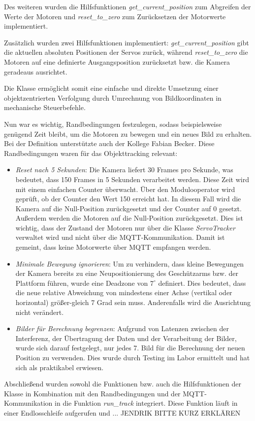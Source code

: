 Des weiteren wurden die Hilfsfunktionen \textit{get\_current\_position} zum Abgreifen der Werte der Motoren und \textit{reset\_to\_zero} zum Zurücksetzen der Motorwerte implementiert.

Zusätzlich wurden zwei Hilfsfunktionen implementiert: \textit{get\_current\_position} gibt die aktuellen absoluten Positionen der Servos zurück, während \textit{reset\_to\_zero} die Motoren auf eine definierte Ausgangsposition zurücksetzt bzw. die Kamera geradeaus ausrichtet.

Die Klasse ermöglicht somit eine einfache und direkte Umsetzung einer objektzentrierten Verfolgung durch Umrechnung von Bildkoordinaten in mechanische Steuerbefehle.

Nun war es wichtig, Randbedingungen festzulegen, sodass beispielsweise genügend Zeit bleibt, um die Motoren zu bewegen und ein neues Bild zu erhalten. Bei der Definition unterstützte auch der Kollege Fabian Becker. Diese Randbedingungen waren für das Objekttracking relevant:

\begin{itemize}
    \item \textit{Reset nach 5 Sekunden}: Die Kamera liefert 30 Frames pro Sekunde, was bedeutet, dass 150 Frames in 5 Sekunden verarbeitet werden. Diese Zeit wird mit einem einfachen Counter überwacht. Über den Modulooperator wird geprüft, ob der Counter den Wert 150 erreicht hat. In diesem Fall wird die Kamera auf die Null-Position zurückgesetzt und der Counter auf 0 gesetzt. Außerdem werden die Motoren auf die Null-Position zurückgesetzt. Dies ist wichtig, dass der Zustand der Motoren nur über die Klasse \textit{ServoTracker} verwaltet wird und nicht über die MQTT-Kommunikation. Damit ist gemeint, dass keine Motorwerte über MQTT empfangen werden.
    
    \item \textit{Minimale Bewegung ignorieren}: Um zu verhindern, dass kleine Bewegungen der Kamera bereits zu eine Neupositionierung des Geschützarms bzw. der Plattform führen, wurde eine Deadzone von $7^\circ$ definiert. Dies bedeutet, dass die neue relative Abweichung von mindestens einer Achse (vertikal oder horizontal) größer-gleich 7 Grad sein muss. Anderenfalls wird die Ausrichtung nicht verändert.
    
    \item \textit{Bilder für Berechnung begrenzen}: Aufgrund von Latenzen zwischen der Interferenz, der Übertragung der Daten und der Verarbeitung der Bilder, wurde sich darauf festgelegt, nur jedes 7. Bild für die Berechnung der neuen Position zu verwenden. Dies wurde durch Testing im Labor ermittelt und hat sich als praktikabel erwiesen.
\end{itemize}

Abschließend wurden sowohl die Funktionen bzw. auch die Hilfsfunktionen der Klasse in Kombination mit den Randbedingungen und der MQTT-Kommunikation in die Funktion \textit{run\_track} integriert. Diese Funktion läuft in einer Endlosschleife aufgerufen und ... JENDRIK BITTE KURZ ERKLÄREN